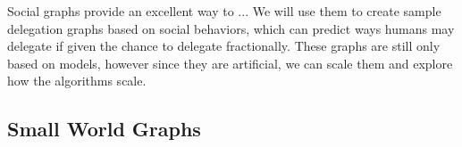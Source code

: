 Social graphs provide an excellent way to ... We will use them to create sample delegation graphs based on social behaviors, which can predict ways humans may delegate if given the chance to delegate fractionally. These graphs are still only based on models, however since they are artificial, we can scale them and explore how the algorithms scale.


\subsection{Small World Graphs}



